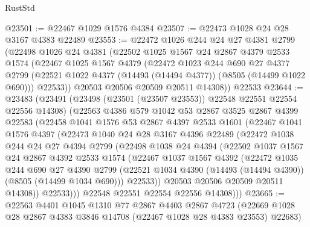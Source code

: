 \begin{lexlean}{RustStd}
\begin{coremodule}
@23501 := @22467 @1029 @1576 @4384
@23507 := @22473 @1028 @24 @28 @3167 @4383 @22489
@23553 := @22472
    @1026
    @244
    @24
    @27
    @4381
    @2799
    (@22498
      @1026
      @24
      @4381
      (@22502
        @1025
        @1567
        @24
        @2867
        @4379
        @2533
        @1574
        (@22467
          @1025
          @1567
          @4379
          (@22472
            @1023
            @244
            @690
            @27
            @4377
            @2799
            (@22521 @1022 @4377 (@14493 (@14494 @4377)) (@8505 (@14499 @1022 @690)))
            @22533))
        @20503
        @20506
        @20509
        @20511
        @14308))
    @22533
@23644 := @23483
    (@23491
      (@23498 (@23501 (@23507 @23553)) @22548 @22551 @22554 @22556 @14308)
      (@22563
        @4386
        @579
        @1042
        @53
        @2867
        @3525
        @2867
        @4399
        @22583
        (@22458
          @1041
          @1576
          @53
          @2867
          @4397
          @2533
          @1601
          (@22467
            @1041
            @1576
            @4397
            (@22473
              @1040
              @24
              @28
              @3167
              @4396
              @22489
              (@22472
                @1038
                @244
                @24
                @27
                @4394
                @2799
                (@22498
                  @1038
                  @24
                  @4394
                  (@22502
                    @1037
                    @1567
                    @24
                    @2867
                    @4392
                    @2533
                    @1574
                    (@22467
                      @1037
                      @1567
                      @4392
                      (@22472
                        @1035
                        @244
                        @690
                        @27
                        @4390
                        @2799
                        (@22521 @1034 @4390 (@14493 (@14494 @4390)) (@8505 (@14499 @1034 @690)))
                        @22533))
                    @20503
                    @20506
                    @20509
                    @20511
                    @14308))
                @22533)))
          @22548
          @22551
          @22554
          @22556
          @14308)))
@23665 := @22563
    @4401
    @1045
    @1310
    @77
    @2867
    @4403
    @2867
    @4723
    (@22669 @1028 @28 @2867 @4383 @3846 @14708 (@22467 @1028 @28 @4383 @23553) @22683)

\end{coremodule}
\end{lexlean}

